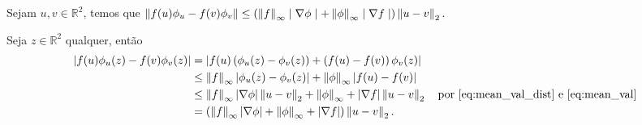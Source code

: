 \begin{lem}\label{lema:persimg}
    Sejam $u,v\in \mathbb{R}^2$, temos que $\left\lVert f(u)\phi_u - f(v)\phi_v\right\rVert \leq 
    \left( \left\lVert f\right\rVert_\infty \mid \nabla \phi \mid + \left\lVert\phi\right\rVert_\infty \mid \nabla f \mid \right) \left\lVert u-v\right\rVert_2.$
\end{lem}
\begin{demonstracao}
Seja $z\in \mathbb{R}^2$ qualquer, então
\begin{align*}
  \begin{split}
    \left\lvert f(u)\phi_u(z) - f(v)\phi_v(z)\right\rvert &= \left\lvert f(u) \left(\phi_u(z) - \phi_v(z)\right) + \left( f(u) - f(v)\right)
    \phi_v(z)\right\rvert \\
    &\leq \left\lVert f\right\rVert_\infty \left\lvert\phi_u(z) - \phi_v(z)\right\rvert + \left\lVert\phi\right\rVert_\infty \left\lvert f(u) - f(v)\right\rvert\\
    &\leq \left\lVert f\right\rVert_\infty \left\lvert\nabla \phi\right\rvert \left\lVert u-v\right\rVert_2 + \left\lVert\phi\right\rVert_\infty + \left\lvert\nabla f\right\rvert \left\lVert u-v\right\rVert_2 
     \quad \text{por \ref{eq:mean_val_dist} e \ref{eq:mean_val}}\\
    &= \left( \left\lVert f\right\rVert_\infty \left\lvert\nabla \phi\right\rvert + \left\lVert\phi\right\rVert_\infty + \left\lvert\nabla f\right\rvert\right) \left\lVert u-v\right\rVert_2.
  \end{split}
\end{align*}
\end{demonstracao}

